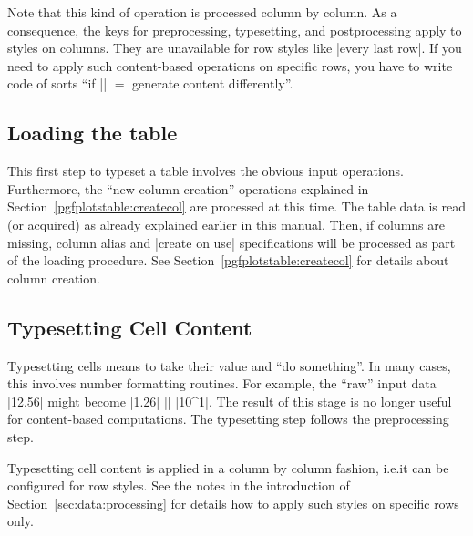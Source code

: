 \documentclass[a4paper]{ltxdoc}
\begin{document}
Note that this kind of operation is processed column by column. As a
consequence, the keys for preprocessing, typesetting, and postprocessing apply
to styles on columns. They are unavailable for row styles like
|every last row|. If you need to apply such content-based operations on
specific rows, you have to write code of sorts ``if |\pgfplotstablerow| $=$
generate content differently''.


\subsection{Loading the table}

This first step to typeset a table involves the obvious input operations.
Furthermore, the ``new column creation'' operations explained in
Section~\ref{pgfplotstable:createcol} are processed at this time. The table
data is read (or acquired) as already explained earlier in this manual. Then,
if columns are missing, column alias and |create on use| specifications will be
processed as part of the loading procedure. See
Section~\ref{pgfplotstable:createcol} for details about column creation.


\subsection{Typesetting Cell Content}

Typesetting cells means to take their value and ``do something''. In many
cases, this involves number formatting routines. For example, the ``raw'' input
data |12.56| might become |1.26| |\cdot| |10^1|. The result of this stage is no
longer useful for content-based computations. The typesetting step follows the
preprocessing step.

Typesetting cell content is applied in a column by column fashion, i.e.\@ it
can be configured for row styles. See the notes in the introduction of
Section~\ref{sec:data:processing} for details how to apply such styles on
specific rows only.
\end{document}

